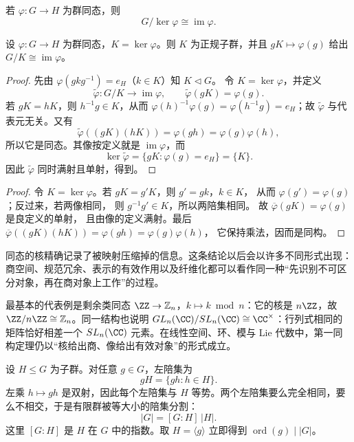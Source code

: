 \begin{theorem}[第一同构定理]
若 $\varphi:G\to H$ 为群同态，则
\begin{equation}
G/\ker\varphi\cong \operatorname{im}\varphi.
\label{eq:first-isomorphism-theorem}
\end{equation}
\end{theorem}

\begin{theorem}[第一同构定理]
设 $\varphi:G\to H$ 为群同态，$K=\ker\varphi$。则 $K$ 为正规子群，并且 $gK\mapsto\varphi(g)$ 给出 $G/K\cong\operatorname{im}\varphi$。
\end{theorem}
\begin{proof}
先由 $\varphi(gkg^{-1})=e_H$（$k\in K$）知 $K\triangleleft G$。
令 $K=\ker\varphi$，并定义
\[
\widetilde\varphi:G/K\longrightarrow\operatorname{im}\varphi,
\qquad \widetilde\varphi(gK)=\varphi(g).
\]
若 $gK=hK$，则 $h^{-1}g\in K$，从而
$\varphi(h)^{-1}\varphi(g)=\varphi(h^{-1}g)=e_H$；故
$\widetilde\varphi$ 与代表元无关。又有
\[
\widetilde\varphi((gK)(hK))
=\varphi(gh)
=\varphi(g)\varphi(h),
\]
所以它是同态。其像按定义就是 $\operatorname{im}\varphi$，而
\[
\ker\widetilde\varphi
=\{gK:\varphi(g)=e_H\}
=\{K\}.
\]
因此 $\widetilde\varphi$ 同时满射且单射，得到。
\end{proof}

\begin{proof}
令 $K=\ker\varphi$。若 $gK=g'K$，则 $g'=gk$，$k\in K$，
从而 $\varphi(g')=\varphi(g)$；反过来，若两像相同，
则 $g^{-1}g'\in K$，所以两陪集相同。
故 $\overline\varphi(gK)=\varphi(g)$ 是良定义的单射，
且由像的定义满射。最后
$\overline\varphi((gK)(hK))=\varphi(gh)=\varphi(g)\varphi(h)$，
它保持乘法，因而是同构。
\end{proof}

同态的核精确记录了被映射压缩掉的信息。这条结论以后会以许多不同形式出现：商空间、规范冗余、表示的有效作用以及纤维化都可以看作同一种“先识别不可区分对象，再在商对象上工作”的过程。

最基本的代表例是剩余类同态
$\ZZ\to\mathbb Z_n$，$k\mapsto k\bmod n$：它的核是
$n\ZZ$，故 $\ZZ/n\ZZ\cong\mathbb Z_n$。同一结构也说明
$GL_n(\CC)/SL_n(\CC)\cong\CC^\times$：行列式相同的矩阵恰好相差一个
$SL_n(\CC)$ 元素。在线性空间、环、模与 Lie 代数中，第一同构定理仍以“核给出商、像给出有效对象”的形式成立。

设 $H\le G$ 为子群。对任意 $g\in G$，左陪集为
\[
gH=\{gh:h\in H\}.
\]
左乘 $h\mapsto gh$ 是双射，因此每个左陪集与 $H$ 等势。两个左陪集要么完全相同，要么不相交，于是有限群被等大小的陪集分割：
\begin{equation*}|G|=[G:H]\,|H|.\end{equation*}
这里 $[G:H]$ 是 $H$ 在 $G$ 中的指数。取 $H=\langle g\rangle$ 立即得到 $\operatorname{ord}(g)\mid |G|$。

